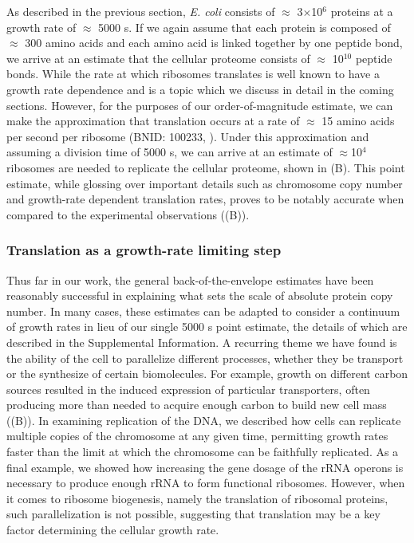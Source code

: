 As described in the previous section, \textit{E. coli} consists of $\approx$
3$\times$10$^6$ proteins at a growth rate of $\approx$ 5000 s. If we again
assume that each protein is composed of $\approx$ 300 amino acids and each amino
acid is linked together by one peptide bond, we arrive at an estimate that the
cellular proteome consists of $\approx$ 10$^10$ peptide bonds. While the rate at
which ribosomes translates is well known to have a growth rate dependence
\cite{dai2018} and is a topic which we discuss in detail in the coming sections.
However, for the purposes of our order-of-magnitude estimate, we can make the
approximation that translation occurs at a rate of $\approx$ 15 amino acids per
second per ribosome (BNID: 100233, \cite{milo2010}). Under this approximation
and assuming a division time of 5000 s, we can arrive at an estimate of
$\approx$10$^4$ ribosomes are needed to replicate the cellular proteome, shown
in (B). This point estimate, while glossing over
important details such as chromosome copy number and growth-rate dependent
translation rates, proves to be notably accurate when compared to the
experimental observations ((B)).

\subsubsection{Translation as a growth-rate limiting step}
Thus far in our work, the general back-of-the-envelope estimates have been
reasonably successful in explaining what sets the scale of absolute protein copy
number. In many cases, these estimates can be adapted to consider a continuum of
growth rates in lieu of our single 5000 s point estimate, the details of which are
described in the Supplemental Information. A recurring theme we have found
is the ability of the cell to parallelize different processes, whether they be transport or the
synthesize of certain biomolecules. For example, growth on different carbon sources
resulted in the induced
expression of particular transporters, often producing more
than needed to acquire enough carbon to build new cell mass ((B)). In
examining replication of the DNA, we described how cells can replicate multiple
copies of the chromosome at any given time, permitting growth rates faster than
the limit at which the chromosome can be faithfully replicated.  As a final
example, we showed how increasing the gene dosage of the rRNA operons is
necessary to produce enough rRNA to form functional ribosomes. However, when it
comes to ribosome biogenesis, namely the translation of ribosomal proteins,
such parallelization is not possible, suggesting that translation may be a key
factor determining the cellular growth rate.

